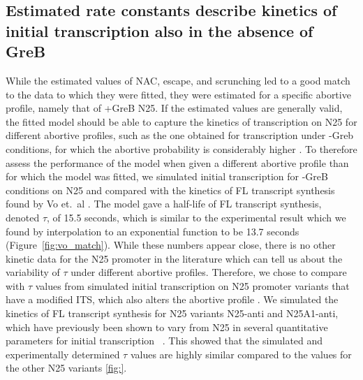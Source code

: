 \subsection{Estimated rate constants describe kinetics of initial
    transcription also in the absence of GreB}
While the estimated values of NAC, escape, and scrunching led to a good match
to the data to which they were fitted, they were estimated for a specific
abortive profile, namely that of +GreB N25. If the estimated values are
generally valid, the fitted model should be able to capture the kinetics of
transcription on N25 for different abortive profiles, such as the one
obtained for transcription under -Greb conditions, for which the abortive
probability is considerably higher \cite{hsu_initial_2006}. To therefore
assess the performance of the model when given a different abortive profile
than for which the model was fitted, we simulated initial transcription for
-GreB conditions on N25 and compared with the kinetics of FL transcript
synthesis found by Vo et.\ al \cite{vo_vitro_2003-1}. The model gave a
half-life of FL transcript synthesis, denoted $\tau$, of 15.5 seconds, which
is similar to the experimental result which we found by interpolation to an
exponential function to be 13.7 seconds (Figure~\ref{fig:vo_match}). While
these numbers appear close, there is no other kinetic data for the N25
promoter in the literature which can tell us about the variability of $\tau$
under different abortive profiles. Therefore, we chose to compare with $\tau$
values from simulated initial transcription on N25 promoter variants that have
a modified ITS, which also alters the abortive profile
\cite{hsu_initial_2006}. We simulated the kinetics of FL transcript synthesis
for N25 variants N25-anti and N25A1-anti, which have previously been shown to
vary from N25 in several quantitative parameters for initial transcription~
\cite{hsu_initial_2006,chan_anti-initial_2001,kammerer_functional_1986}. This
showed that the simulated and experimentally determined $\tau$ values are
highly similar compared to the values for the other N25 variants \ref{fig:}.

